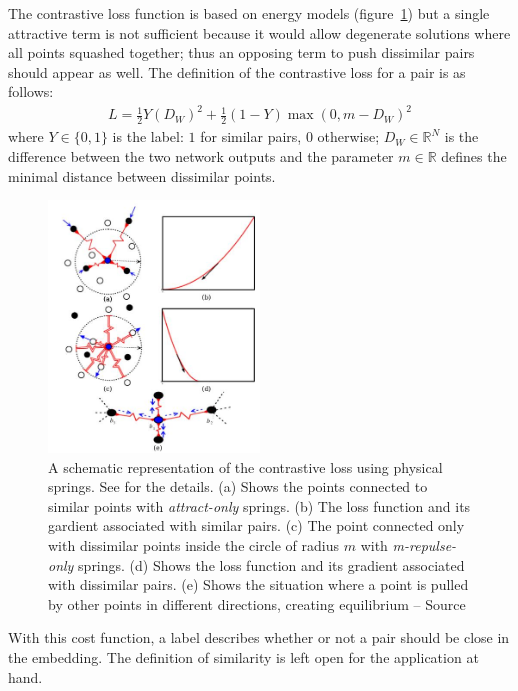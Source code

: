 \documentclass[a4paper,12pt]{report}
\newcommand{\R}{\mathbb{R}}
\begin{document}
The contrastive loss function is based on energy models (figure~\ref{fig:contrastive_spring}) but a single attractive term is not sufficient because it would allow degenerate solutions where all points squashed together; thus an opposing term to push dissimilar pairs should appear as well.
The definition of the contrastive loss for a pair is as follows:
\begin{eqnarray}
    L = \frac{1}{2} Y (D_W)^2 + \frac{1}{2} (1-Y) \max(0, m - D_W)^2
\end{eqnarray}
where $Y \in \{0,1\}$ is the label: $1$ for similar pairs, $0$ otherwise; $D_W \in \R^N$ is the difference between the two network outputs and the parameter $m \in \R$ defines the minimal distance between dissimilar points.

\begin{figure}[t]
    \begin{center}
        \includegraphics[width=0.5\textwidth]{thesis_figures/contrastive_spring.jpg}
    \end{center}
    \caption{A schematic representation of the contrastive loss using physical springs. See \cite{hadsell2006dimensionality} for the details. (a) Shows the points connected to similar points with {\em attract-only} springs. (b) The loss function and its gardient associated with similar pairs. (c) The point connected only with dissimilar points inside the circle of radius $m$ with {\em m-repulse-only} springs. (d) Shows the loss function and its gradient associated with dissimilar pairs. (e) Shows the situation where a point is pulled by other points in different directions, creating equilibrium -- Source \cite{hadsell2006dimensionality}}
    \label{fig:contrastive_spring}
\end{figure}

With this cost function, a label describes whether or not a pair should be close in the embedding.
The definition of similarity is left open for the application at hand.
\end{document}

